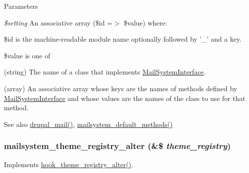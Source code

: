 \begin{DoxyParams}{Parameters}
\item[{\em \$setting}]An associative array (\$id =$>$ \$value) where:
\begin{DoxyItemize}
\item \$id is the machine-\/readable module name optionally followed by '\_\-' and a key.
\item \$value is one of
\begin{DoxyItemize}
\item (string) The name of a class that implements \hyperlink{interfaceMailSystemInterface}{MailSystemInterface}.
\item (array) An associative array whose keys are the names of methods defined by \hyperlink{interfaceMailSystemInterface}{MailSystemInterface} and whose values are the names of the class to use for that method.
\end{DoxyItemize}
\end{DoxyItemize}\end{DoxyParams}
\begin{DoxySeeAlso}{See also}
\hyperlink{mail_8inc_ab80781fd7273975a77cbbd13300eddbf}{drupal\_\-mail()}, \hyperlink{mailsystem_8module_a550d9fb0b029f862fbfdfc31670ca4da}{mailsystem\_\-default\_\-methods()} 
\end{DoxySeeAlso}
\hypertarget{mailsystem_8module_a07a179ae1d27c3fe2e0722316e6088e4}{
\subsubsection[{mailsystem\_\-theme\_\-registry\_\-alter}]{\setlength{\rightskip}{0pt plus 5cm}mailsystem\_\-theme\_\-registry\_\-alter (\&\$ {\em theme\_\-registry})}}
\label{mailsystem_8module_a07a179ae1d27c3fe2e0722316e6088e4}
Implements \hyperlink{group__hooks_gadd6cabb9ce825efccefb4918321932a5}{hook\_\-theme\_\-registry\_\-alter()}. 